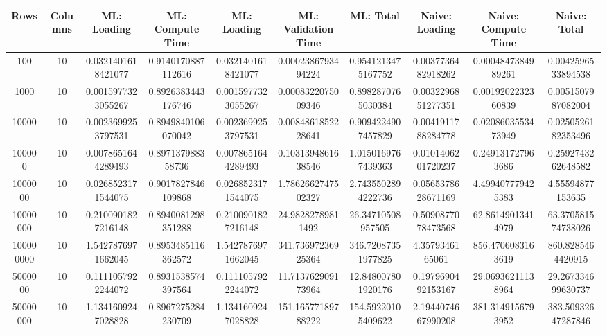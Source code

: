 \begin{table}[htb]
    \centering
    \begin{tabular}{@{}cccccccccc@{}}
        \toprule
        Rows & Columns & ML: Loading & ML: Compute Time & ML: Loading & ML: Validation Time & ML: Total & Naive: Loading & Naive: Compute Time & Naive: Total \\
        \midrule
        100 & 10 & 0.0321401618421077 & 0.9140170887112616 & 0.0321401618421077 & 0.0002386793494224 & 0.9541213475167752 & 0.0037736482918262 & 0.0004847384989261 & 0.0042596533894538 \\
        1000 & 10 & 0.0015977323055267 & 0.8926383443176746 & 0.0015977323055267 & 0.0008322075009346 & 0.8982870765030384 & 0.0032296851277351 & 0.0019202232360839 & 0.0051507987082004 \\
        10000 & 10 & 0.0023699253797531 & 0.8949840106070042 & 0.0023699253797531 & 0.0084861852228641 & 0.9094224907457829 & 0.0041911788284778 & 0.0208603553473949 & 0.0250526182353496 \\
        100000 & 10 & 0.0078651644289493 & 0.897137988358736 & 0.0078651644289493 & 0.1031394861638546 & 1.0150169767439363 & 0.0101406201720237 & 0.249131727963686 & 0.2592743262648582 \\
        1000000 & 10 & 0.0268523171544075 & 0.9017827846109868 & 0.0268523171544075 & 1.7862662747502327 & 2.7435502894222736 & 0.0565378628671169 & 4.499407779425383 & 4.55594877153635 \\
        10000000 & 10 & 0.2100901827216148 & 0.8940081298351288 & 0.2100901827216148 & 24.98282789811492 & 26.34710508957505 & 0.5090877078473568 & 62.86149013414979 & 63.370581574738026 \\
        100000000 & 10 & 1.5427876971662045 & 0.8953485116362572 & 1.5427876971662045 & 341.73697236925364 & 346.72087351977825 & 4.3579346165061 & 856.4706083163619 & 860.8285464420915 \\
        5000000 & 10 & 0.1111057922244072 & 0.8931538574397564 & 0.1111057922244072 & 11.713762909173964 & 12.848007801920176 & 0.1979690492153167 & 29.06936211138964 & 29.267334699630737 \\
        50000000 & 10 & 1.1341609247028828 & 0.8967275284230709 & 1.1341609247028828 & 151.16577189788222 & 154.59220105409622 & 2.1944074667990208 & 381.3149156793952 & 383.50932647287846 \\
        \bottomrule
    \end{tabular}
\end{table}